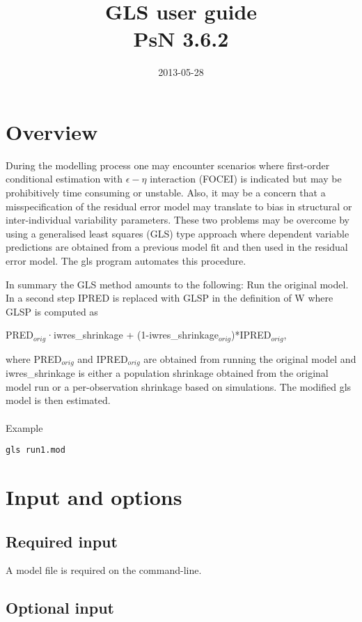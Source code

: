 \documentclass[a4paper,12pt]{article}
\title{GLS user guide\\ \vspace{2 mm} {\large PsN 3.6.2}}
\date{2013-05-28}
\begin{document}
\maketitle


\section{Overview}
During the modelling process one may encounter scenarios where first-order conditional estimation with $\epsilon - \eta$ interaction (FOCEI) is indicated but may be prohibitively time consuming or unstable. Also, it may be a concern that a misspecification of the residual error model may translate to bias in structural or inter-individual variability parameters. These two problems may be overcome by using a generalised least squares (GLS) type approach where dependent variable predictions are obtained from a previous model fit and then used in the residual error model. The gls program automates this procedure.

In summary the GLS method amounts to the following: Run the original model. In a second step IPRED is replaced with GLSP in the definition of W where GLSP is computed as 

PRED$_{orig}$·iwres\_shrinkage + (1-iwres\_shrinkage$_{orig}$)*IPRED$_{orig}$, 

where  PRED$_{orig}$ and IPRED$_{orig}$ are obtained from running the original model and iwres\_shrinkage is either a population shrinkage obtained from the original model run or a per-observation shrinkage based on simulations. The modified gls model is then estimated.
\\
\\
Example
\begin{verbatim}
gls run1.mod
\end{verbatim}

\section{Input and options}

\subsection{Required input}
A model file is required on the command-line.


\subsection{Optional input}
\end{document}
